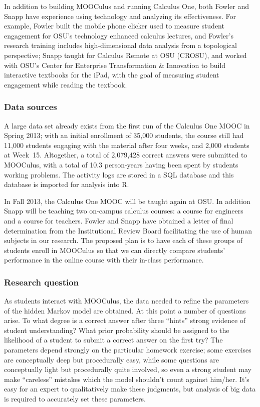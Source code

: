 \documentclass[12pt]{article}
\begin{document}
In addition to building MOOCulus and running Calculus One, both Fowler
and Snapp have experience using technology and analyzing its
effectiveness.  For example, Fowler built the mobile phone clicker
used to measure student engagement for OSU's technology enhanced
calculus lectures, and Fowler's research training includes
high-dimensional data analysis from a topological perspective; Snapp
taught for Calculus Remote at OSU (CROSU), and worked with OSU's
Center for Enterprise Transformation \& Innovation to build
interactive textbooks for the iPad, with the goal of measuring student
engagement while reading the textbook.

\subsubsection*{Data sources}

A large data set already exists from the first run of the Calculus One
MOOC in Spring 2013; with an initial enrollment of 35,000 students,
the course still had 11,000 students engaging with the material after
four weeks, and 2,000 students at Week~15.  Altogether, a total of
2,079,428 correct answers were submitted to MOOCulus, with a total of
10.3 person-years having been spent by students working problems.  The
activity logs are stored in a SQL database and this database is
imported for analysis into R.

In Fall 2013, the Calculus One MOOC will be taught again at OSU.  In
addition Snapp will be teaching two on-campus calculus courses: a
course for engineers and a course for teachers.  Fowler and Snapp have
obtained a letter of final determination from the Institutional Review
Board facilitating the use of human subjects in our research.  The
proposed plan is to have each of these groups of students enroll in
MOOCulus so that we can directly compare students' performance in the
online course with their in-class performance.


\subsubsection*{Research question}

As students interact with MOOCulus, the data needed to refine the
parameters of the hidden Markov model are obtained.  At this point a
number of questions arise. To what degree is a correct answer after
three ``hints'' strong evidence of student understanding?  What prior
probability should be assigned to the likelihood of a student to
submit a correct answer on the first try?  The parameters depend
strongly on the particular homework exercise; some exercises are
conceptually deep but procedurally easy, while some questions are
conceptually light but procedurally quite involved, so even a strong
student may make ``careless'' mistakes which the model shouldn't count
against him/her.  It's easy for an expert to qualitatively make these
judgments, but analysis of big data is required to accurately set
these parameters.
\end{document}
